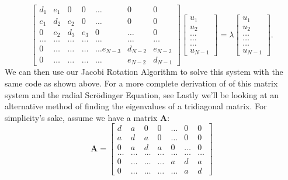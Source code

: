 \documentclass{article}
\begin{document}
\begin{equation*}
    \begin{bmatrix}d_1 & e_1 & 0   & 0    & \dots  &0     & 0 \\
                                e_1 & d_2 & e_2 & 0    & \dots  &0     &0 \\
                                0   & e_2 & d_3 & e_3  &0       &\dots & 0\\
                                \dots  & \dots & \dots & \dots  &\dots      &\dots & \dots\\
                                0   & \dots & \dots & \dots  &\dots  e_{N-3}     &d_{N-2} & e_{N-2}\\
                                0   & \dots & \dots & \dots  &\dots       &e_{N-2} & d_{N-1}
             \end{bmatrix}  \begin{bmatrix} u_{1} \\
                                                              u_{2} \\
                                                              \dots\\ \dots\\ \dots\\
                                                              u_{N-1}
             \end{bmatrix}=\lambda \begin{bmatrix} u_{1} \\
                                                              u_{2} \\
                                                              \dots\\ \dots\\ \dots\\
                                                              u_{N-1}
             \end{bmatrix}.  
      \label{eq:sematrix}
\end{equation*}
We can then use our Jacobi Rotation Algorithm to solve this system with the same code as shown above. For a more complete derivation of of this matrix system and the radial Scrödinger Equation, see \cite{projText}
\newline
Lastly we'll be looking at an alternative method of finding the eigenvalues of a tridiagonal matrix.
For simplicity's sake, assume we have a matrix $\mathbf{A}$:
\[
\mathbf{A} = 
\begin{bmatrix} d& a & 0   & 0    & \dots  &0     & 0 \\
                                a & d & a & 0    & \dots  &0     &0 \\
                                0   & a & d & a  &0       &\dots & 0\\
                                \dots  & \dots & \dots & \dots  &\dots      &\dots & \dots\\
                                0   & \dots & \dots & \dots  &a  &d & a\\
                                0   & \dots & \dots & \dots  &\dots       &a & d\end{bmatrix} 
\] \newline
\end{document}
